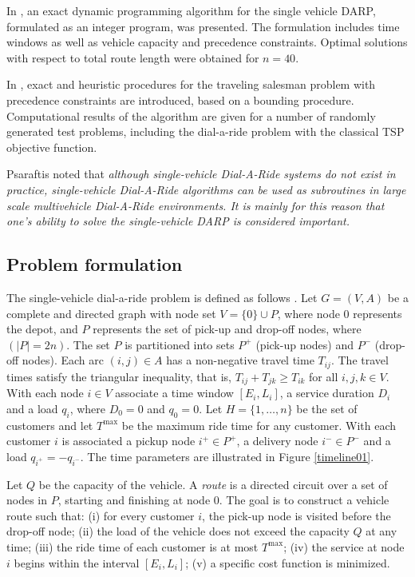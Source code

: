 \documentclass[dissertation,draft*]{aaltoseries}
\begin{document}
In \cite{desrosiers01}, an exact dynamic programming algorithm for the single vehicle DARP, formulated as an integer program, 
was presented. The formulation includes time windows as well as vehicle capacity 
and precedence constraints. Optimal solutions with respect to total route length were obtained for $n=40$.

In \cite{bianco}, exact and heuristic procedures 
for the traveling salesman problem with precedence constraints are introduced, based on
a bounding procedure. Computational results of the algorithm are given for a number
of randomly generated test problems, including the dial-a-ride problem with the classical
TSP objective function.

Psaraftis noted that \emph{although single-vehicle Dial-A-Ride systems do not exist in 
practice, single-vehicle Dial-A-Ride algorithms can be used as subroutines in
large scale multivehicle Dial-A-Ride environments. It is mainly for this reason
that one's ability to solve the single-vehicle DARP is considered important.}

\subsection{Problem formulation}
\label{staticnarrow}
The single-vehicle dial-a-ride problem is defined as follows \citep{berbegliafeas}. 
Let $G = (V, A)$ be a complete and directed graph
with node set $V = \{0\} \cup P$, where node $0$ represents the depot, and $P$ represents 
the set of pick-up and drop-off nodes, where  $(|P| = 2n)$. The set $P$ is partitioned into sets $P^{+}$ (pick-up nodes) and
$P^{-}$ (drop-off nodes). Each arc $(i, j) \in A$ has a non-negative travel time $T_{ij}$. The travel times
satisfy the triangular inequality, that is, $T_{ij} + T_{jk} \geq T_{ik}$ for all $i,j,k \in V$. 
With each node $i \in V$ associate a time window $[E_i , L_i ]$,
a service duration $D_i$ and a load $q_i$, where $D_0 = 0$ and $q_0 = 0$. Let $H = \{1, \ldots , n\}$ be
the set of customers and let $T^{\max}$ be the maximum ride time for any customer. With each customer $i$ is associated
a pickup node $i^{+} \in P^{+}$, a delivery node $i^{-} \in P^{-}$ and a load $q_{i^+} = -q_{i^-}$. 
The time parameters are illustrated in Figure \ref{timeline01}.

Let $Q$ be the capacity of the vehicle. 
A \emph{route} is a directed circuit over a set of nodes in $P$, starting and finishing at node $0$. The goal is to construct a
vehicle route such that: (i) for every customer $i$, the pick-up node is visited before the drop-off node;
(ii) the load of the vehicle does not exceed the capacity $Q$ at any time;
(iii) the ride time of each customer is at most $T^{\max}$;
(iv) the service at node $i$ begins within the interval $[E_i , L_i]$;
(v) a specific cost function is minimized.
\end{document}

